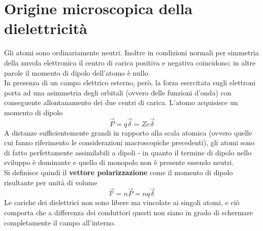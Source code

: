 \section{Origine microscopica della dielettricità}
Gli atomi sono ordinariamente neutri. Inoltre in condizioni normali per simmetria della nuvola elettronica il centro di carica positiva e negativa coincidono; in altre parole il momento di dipolo dell'atomo è nullo. 
\\In presenza di un campo elettrico esterno, però, la forza esercitata sugli elettroni porta ad una asimmetria degli orbitali (ovvero delle funzioni d'onda) con conseguente allontanamento dei due centri di carica. L'atomo acquisisce un momento di dipolo
\[\vec{P} = q \vec{\delta} = Z e \vec{\delta}\]
A distanze sufficientemente grandi in rapporto alla scala atomica (ovvero quelle cui fanno riferimento le considerazioni macroscopiche precedenti), gli atomi sono di fatto perfettamente assimilabili a dipoli - in quanto il termine di dipolo nello sviluppo è dominante e quello di monopolo non è presente essendo neutri.
\\Si definisce quindi il \textbf{vettore polarizzazione} come il momento di dipolo risultante per unità di volume
\[\vec{\mathbb{P}} = n \vec{P} = n q \vec{\delta}\]
Le cariche dei dielettrici non sono libere ma vincolate ai singoli atomi, e ciò comporta che a differenza dei conduttori questi non siano in grado di schermare completamente il campo all'interno.

